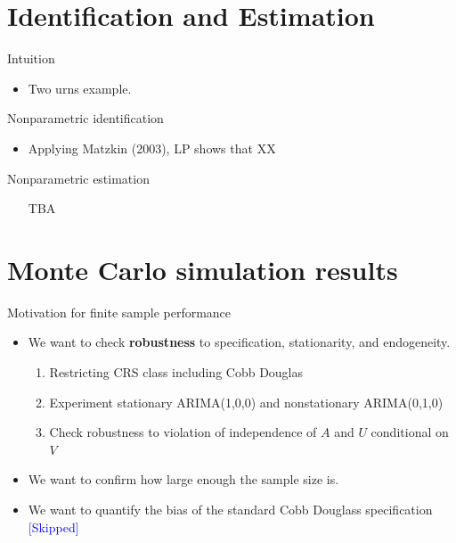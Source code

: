 \documentclass[aspectratio=169]{beamer}
\begin{document}
\section{Identification and Estimation}

\begin{frame}{Intuition}
    \begin{itemize}
    \item Two urns example.
    \end{itemize}
\end{frame}

\begin{frame}{Nonparametric identification}
    \begin{itemize}
    \item Applying Matzkin (2003), LP shows that XX
    \end{itemize}
\end{frame}

\begin{frame}{Nonparametric estimation}
    \begin{itemize}
    \item [TBA]
    \end{itemize}
\end{frame}



\section{Monte Carlo simulation results}

\begin{frame}{Motivation for finite sample performance}
\begin{itemize}
    \item We want to check \textbf{robustness} to specification, stationarity, and endogeneity.
    \begin{enumerate}
        \item Restricting CRS class including Cobb Douglas
        \item Experiment stationary ARIMA(1,0,0) and nonstationary ARIMA(0,1,0)
        \item Check robustness to violation of independence of $A$ and $U$ conditional on $V$
    \end{enumerate}
    \item We want to confirm how large enough the sample size is.
    \item We want to quantify the bias of the standard Cobb Douglass specification \textcolor{blue}{[Skipped]}
\end{itemize}
    
\end{frame}
\end{document}
